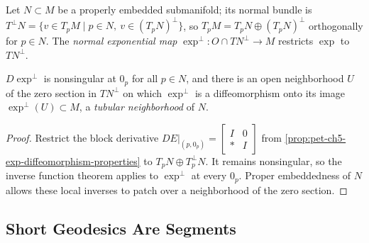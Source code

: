 \begin{definition}
  \label{def:pet-ch5-normal-exponential-map}
  Let $N\subset M$ be a properly embedded submanifold; its normal bundle is
  $T^\perp N=\{v\in T_pM\mid p\in N,\ v\in(T_pN)^\perp\}$, so $T_pM=T_pN\oplus
  (T_pN)^\perp$ orthogonally for $p\in N$. The \emph{normal exponential map}
  $\exp^\perp:O\cap TN^\perp\to M$ restricts $\exp$ to $TN^\perp$.
\end{definition}

\begin{corollary}
  \label{cor:pet-ch5-tubular-neighborhood}
  $D\exp^\perp$ is nonsingular at $0_p$ for all $p\in N$, and there is an open
  neighborhood $U$ of the zero section in $TN^\perp$ on which $\exp^\perp$ is a
  diffeomorphism onto its image $\exp^\perp(U)\subset M$, a \emph{tubular
  neighborhood} of $N$.
\end{corollary}
\begin{proof}
  \sketch
  Restrict the block derivative
  $DE|_{(p,0_p)}=\begin{bmatrix}I&0\\ *&I\end{bmatrix}$ from
  \cref{prop:pet-ch5-exp-diffeomorphism-properties} to
  $T_pN\oplus T_p^\perp N$.  It remains nonsingular, so the inverse function
  theorem applies to $\exp^\perp$ at every $0_p$.  Proper embeddedness of $N$
  allows these local inverses to patch over a neighborhood of the zero section.
\end{proof}

\subsection{Short Geodesics Are Segments}

